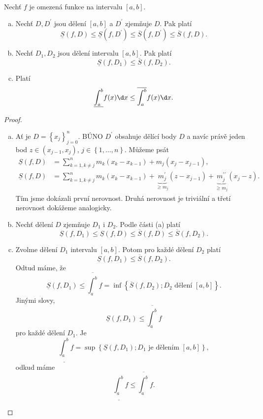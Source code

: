 \begin{lemma} \label{lemma8.10}
Nechť $f$ je omezená funkce na intervalu $[a,b]$.
\begin{enumerate}[(a)]
	\item Nechť $D, D^\prime$ jsou dělení $[a,b]$ a $D^\prime$ zjemňuje $D$. Pak platí
\[
\underline{S}(f,D) \le \underline{S}(f,D^\prime) \le \overline{S}(f,D^\prime) \le \overline{S}(f,D).
\]
\item Nechť $D_1, D_2$ jsou dělení intervalu $[a,b]$. Pak platí
\[
\underline{S}(f,D_1) \le \overline{S}(f,D_2).
\]
\item Platí
\[
\underline{\int_a^b} f(x)\d x \le \overline{\int_a^b} f(x)\d x.
\]
\end{enumerate}
\end{lemma}

\begin{proof}
	\,
	\begin{enumerate}[(a)]
		\item Ať je $D = \left \{ x_j \right \}_{j=0}^n $. BÚNO $D^\prime$ obsahuje dělící body
		$D$ a navíc právě jeden bod $z \in \left( x_{j-1}, x_j \right ) $, $j \in \left \{ 1,\dots, n \right \} $.
		Můžeme psát
		\begin{align*}
		    \underline{S}(f,D) &= \sum_{k=1, k \ne j}^n m_k (x_k-x_{k-1})+ m_j(x_j-x_{j-1}),\\
			\underline{S}(f,D) &= \sum_{k=1, k \ne j}^n m_k (x_k-x_{k-1})+ \underbrace{m_j^\prime}_{\geq m_j}(z-x_{j-1}) + \underbrace{m^{\prime\prime}_j}_{\geq m_j} (x_j - z).
		\end{align*}
		Tím jsme dokázali první nerovnost. Druhá nerovnost je triviální a třetí nerovnost dokážeme analogicky.
		\item Nechť dělení $D$ zjemňuje $D_1$ i $D_2$. Podle části (a) platí
		$$
		    \underline{S}(f,D_1) \leq \underline{S}(f,D) \leq \overline{S}(f,D) \leq \overline{S}(f,D_2).
		$$
		\item Zvolme dělení $D_1$ intervalu $[a,b]$. Potom pro každé dělení $D_2$ platí
		$$
		    \underline{S}(f,D_1) \leq  \overline{S}(f,D_2).
		$$
		Odtud máme, že
		$$\underline{S}(f,D_1) \leq \overline{\int_a^b}f=\inf \left \{ \overline{S}(f,D_2); D_2 \text{ dělení } [a,b]\right \}. $$
		Jinými slovy,
		$$
		    \underline{S}(f,D_1) \leq \overline{\int_a^b}f
		$$
		pro každé dělení $D_1$. Je
		$$
		    \underline{\int_a^b } f = \sup \left \{ \underline{S}(f,D_1); D_1 \text{ je dělením }[a,b] \right \},
		$$
		odkud máme
		$$
		    \underline{\int_a^b}f \leq \overline{\int_a^b}f.
		$$
		\qedhere
	\end{enumerate}
\end{proof}

